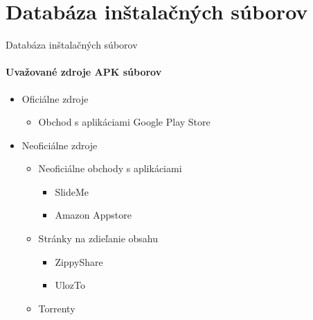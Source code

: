 \documentclass{beamer}
\begin{document}
\section{Databáza inštalačných súborov}
  \begin{frame}[label=lists]{Databáza inštalačných súborov}
    \framesubtitle{Uvažované zdroje APK súborov}
    \begin{itemize}
    \item Oficiálne zdroje
    	\begin{itemize} 
    	\item Obchod s aplikáciami Google Play Store 
    	\end{itemize}
    \item Neoficiálne zdroje
    	\begin{itemize}
    	\item Neoficiálne obchody s aplikáciami
    		\begin{itemize}
    		\item SlideMe
    		\item Amazon Appstore 
			\end{itemize}    	 
    	\end{itemize}
    	\begin{itemize}
    	\item Stránky na zdieľanie obsahu
    		\begin{itemize}
    		\item ZippyShare
    		\item UlozTo 
			\end{itemize}    	 
    	\end{itemize}
    	\begin{itemize}
    	\item Torrenty
    	\end{itemize}
    \end{itemize}  
  \end{frame}  
  
\end{document}
